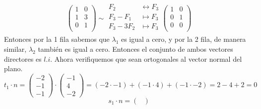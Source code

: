 \documentclass{article}
\begin{document}
\begin{enumerate}
\begin{itemize}
\begin{itemize}
\[                        \begin{pmatrix}
                            1 & 0 \\
                            1 & 3 \\
                            0 & 1 \\
                        \end{pmatrix}
                        \sim
                        \begin{aligned}
                            F_2 &\leftrightarrow F_3 \\
                            F_3 - F_1 &\mapsto F_3 \\
                            F_3 - 3F_2 &\mapsto F_3 \\
                        \end{aligned}
                        \begin{pmatrix}
                            1 & 0 \\
                            0 & 1 \\
                            0 & 0 \\
                        \end{pmatrix}
                    \]
                    Entonces por la 1 fila sabemos que \(\lambda_1\) es igual a cero, y por la 2 fila, de manera similar, \(\lambda_2\) también es igual a cero.
                    Entonces el conjunto de ambos vectores directores es \(l.i\). Ahora verifiquemos que sean ortogonales al vector normal del plano.
                    \[
                        t_1 \cdot n =
                        \begin{pmatrix}
                            -2 \\ -1 \\ -1
                        \end{pmatrix}
                        \cdot
                        \begin{pmatrix}
                            -1 \\ 4 \\ -2
                        \end{pmatrix}
                        =
                        (-2 \cdot -1) + (-1 \cdot 4) + (-1 \cdot -2)
                        =
                        2 - 4 + 2 
                        =
                        0
                    \]
                    \[
                        s_1 \cdot n =
                        \begin{pmatrix}

\end{pmatrix}\]
\end{itemize}
\end{itemize}
\end{enumerate}
\end{document}
